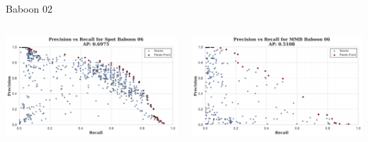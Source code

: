 \begin{frame}{Baboon 02}
    \begin{columns}
        \begin{column}{0.5\textwidth}
            \centering
            \includegraphics[width=\textwidth,keepaspectratio]{images/bom/precision_recall_Spot_Baboon_06.png}
        \end{column}
        \begin{column}{0.5\textwidth}
            \centering
            \includegraphics[width=\textwidth,keepaspectratio]{images/bom/precision_recall_MMB_Baboon_06.png}
        \end{column}
    \end{columns}
\end{frame}

